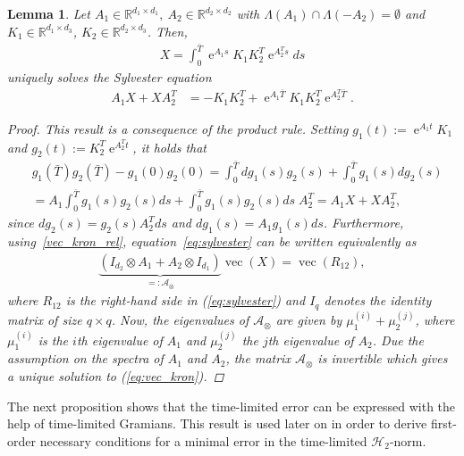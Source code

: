 \documentclass[a4paper,11pt, twoside]{article}
\newcommand{\expn}{\operatorname{e}}
\newcommand{\vect}{\operatorname{vec}}
\newtheorem{lem}[defn]{Lemma}
\begin{document}
\begin{lem}\label{lem:time_lim_sylvester}
Let $A_1\in\mathbb{R}^{d_1\times d_1},~A_2\in\mathbb{R}^{d_2\times d_2}$ with $\Lambda(A_1)\cap\Lambda(-A_2)=\emptyset$ and
$K_1\in\mathbb{R}^{d_1\times d_3}$, $K_2\in\mathbb{R}^{d_2\times d_3}$. Then, \begin{align*}
 X=\int_{0}^{\bar T}\expn^{A_1s}K_1K_2^T \expn^{A_2^Ts}ds
\end{align*}
uniquely solves the Sylvester equation
\begin{align}\label{eq:sylvester}
 A_{1} X+X A_{2}^T &=-K_1 K_2^T+\expn^{A_1{\bar T}}K_1K_2^T\expn^{A_2^T{\bar T}}.
\end{align}
\begin{proof}
This result is a consequence of the product rule. Setting $g_1(t):=\expn^{A_1 t}K_1$ and $g_2(t):=K_2^T \expn^{A_2^T t}$, it 
holds that \begin{align*}
&g_1(\bar T)g_2(\bar T)-g_1(0)g_2(0)=\int_{0}^{\bar T}d g_1(s) g_2(s) + \int_{0}^{\bar T}g_1(s)dg_2(s)\\
&= A_1 \int_{0}^{\bar T} g_1(s) g_2(s) ds + \int_{0}^{\bar T}g_1(s)g_2(s)ds\;A_2^T = A_1X +  XA_2^T,      
 \end{align*}
since $dg_2(s)=g_2(s) A_2^T ds$ and $dg_1(s)=A_1 g_1(s) ds$. Furthermore, using~\eqref{vec_kron_rel},  equation~\eqref{eq:sylvester} can be 
written equivalently as 
\begin{align}\label{eq:vec_kron}
\underbrace{\left(I_{d_2}\otimes A_1+A_2\otimes I_{d_1}\right) }_{=:\mathcal A_\otimes}\vect(X)=\vect(R_{12}),
\end{align}
where $R_{12}$ is the right-hand side in (\ref{eq:sylvester}) and $I_q$ denotes the identity matrix of size 
$q\times q$. Now, the eigenvalues of $\mathcal A_\otimes$ are given by $\mu_1^{(i)}+\mu_2^{(j)}$, where $\mu_1^{(i)}$ is the $i$th eigenvalue of $A_1$ 
and $\mu_2^{(j)}$ the $j$th eigenvalue of $A_2$. Due the assumption on the spectra of $A_1$ and $A_2$, the matrix $\mathcal A_\otimes$ is invertible 
which gives a unique solution to (\ref{eq:vec_kron}).
\end{proof}
       \end{lem}
The next proposition shows that the time-limited error can be expressed with the help of time-limited Gramians. This result is used later on in order 
to derive first-order necessary conditions for a minimal error in the time-limited $\mathcal H_2$-norm.
\end{document}
